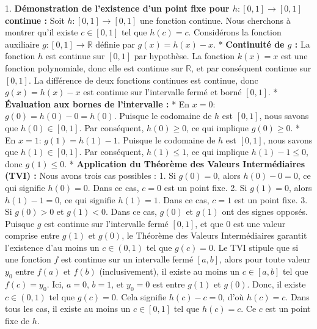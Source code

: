 \documentclass[12pt,a4paper]{report}
\begin{document}
1.  \textbf{Démonstration de l'existence d'un point fixe pour $h: [0, 1] \to [0, 1]$ continue :}
    Soit $h: [0, 1] \to [0, 1]$ une fonction continue. Nous cherchons à montrer qu'il existe $c \in [0, 1]$ tel que $h(c) = c$.
    Considérons la fonction auxiliaire $g: [0, 1] \to \mathbb{R}$ définie par $g(x) = h(x) - x$.
    *   \textbf{Continuité de $g$ :} La fonction $h$ est continue sur $[0, 1]$ par hypothèse. La fonction $k(x) = x$ est une fonction polynomiale, donc elle est continue sur $\mathbb{R}$, et par conséquent continue sur $[0, 1]$. La différence de deux fonctions continues est continue, donc $g(x) = h(x) - x$ est continue sur l'intervalle fermé et borné $[0, 1]$.
    *   \textbf{Évaluation aux bornes de l'intervalle :}
        *   En $x=0$: $g(0) = h(0) - 0 = h(0)$. Puisque le codomaine de $h$ est $[0, 1]$, nous savons que $h(0) \in [0, 1]$. Par conséquent, $h(0) \ge 0$, ce qui implique $g(0) \ge 0$.
        *   En $x=1$: $g(1) = h(1) - 1$. Puisque le codomaine de $h$ est $[0, 1]$, nous savons que $h(1) \in [0, 1]$. Par conséquent, $h(1) \le 1$, ce qui implique $h(1) - 1 \le 0$, donc $g(1) \le 0$.
    *   \textbf{Application du Théorème des Valeurs Intermédiaires (TVI) :}
        Nous avons trois cas possibles :
        1.  Si $g(0) = 0$, alors $h(0) - 0 = 0$, ce qui signifie $h(0) = 0$. Dans ce cas, $c=0$ est un point fixe.
        2.  Si $g(1) = 0$, alors $h(1) - 1 = 0$, ce qui signifie $h(1) = 1$. Dans ce cas, $c=1$ est un point fixe.
        3.  Si $g(0) > 0$ et $g(1) < 0$. Dans ce cas, $g(0)$ et $g(1)$ ont des signes opposés. Puisque $g$ est continue sur l'intervalle fermé $[0, 1]$, et que $0$ est une valeur comprise entre $g(1)$ et $g(0)$, le Théorème des Valeurs Intermédiaires garantit l'existence d'au moins un $c \in (0, 1)$ tel que $g(c) = 0$.
            Le TVI stipule que si une fonction $f$ est continue sur un intervalle fermé $[a, b]$, alors pour toute valeur $y_0$ entre $f(a)$ et $f(b)$ (inclusivement), il existe au moins un $c \in [a, b]$ tel que $f(c) = y_0$.
            Ici, $a=0$, $b=1$, et $y_0=0$ est entre $g(1)$ et $g(0)$.
            Donc, il existe $c \in (0, 1)$ tel que $g(c) = 0$.
            Cela signifie $h(c) - c = 0$, d'où $h(c) = c$.
    Dans tous les cas, il existe au moins un $c \in [0, 1]$ tel que $h(c) = c$. Ce $c$ est un point fixe de $h$.
\end{document}
